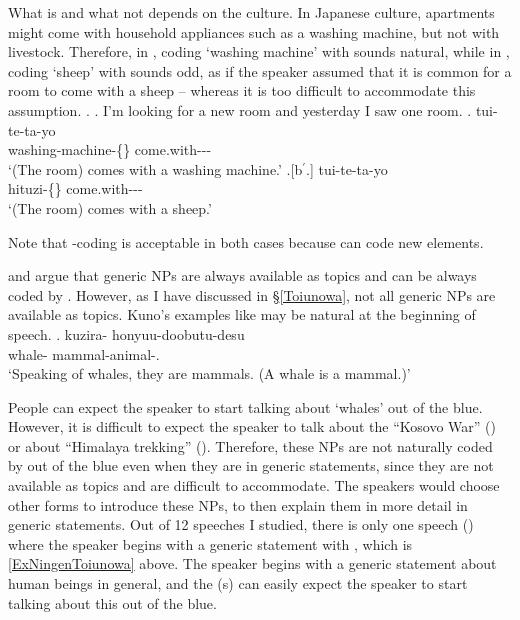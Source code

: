 What is  and what not depends on the culture.
In Japanese culture,
apartments might come with household appliances such as a washing machine,
but not with livestock.
Therefore, in \Next[b],
coding  `washing machine' with  sounds natural,
while in \Next[b$^{\prime}$],
coding  `sheep' with  sounds odd, as if the speaker assumed that it is common for a room to come with a sheep -- whereas it is too difficult to accommodate this assumption.
\ex.\label{ExSentakuki}
 \a. I'm looking for a new room and yesterday I saw one room.
 \bg.  tui-te-ta-yo \\
 	washing-machine-\{\} come.with--- \\
	`(The room) comes with a washing machine.'
 \bg.[b$^{\prime}$.]  tui-te-ta-yo \\
 	hituzi-\{\} come.with--- \\
	`(The room) comes with a sheep.'

Note that -coding is acceptable in both cases
because  can code new elements.

 and  argue that
generic NPs are always available as topics and
can be always coded by .
However, as I have discussed in \S \ref{Toiunowa},
not all generic NPs are available as topics.
Kuno's examples like \Next may be natural at the beginning of speech.
%
\exg. kuzira- honyuu-doobutu-desu \\
      whale- mammal-animal-. \\
      `Speaking of whales, they are mammals. (A whale is a mammal.)'
      \hfill{\cite[44]{kuno73}}

People can expect the speaker to start talking about  `whales' out of the blue.
However, it is difficult to expect the speaker to talk about
the ``Kosovo War'' () or about ``Himalaya trekking'' ().
Therefore,
these NPs  are not naturally coded by  out of the blue
even when they are in generic statements,
since they are not available as topics and are difficult to accommodate.
The speakers would choose other forms to introduce these NPs, to then explain them in more detail in generic statements.
Out of 12 speeches I studied,
there is only one speech () where the speaker begins with a generic statement with ,
which is \ref{ExNingenToiunowa} above.
The speaker begins with a generic statement about human beings in general, and the (s) can easily expect the speaker to start talking about this out of the blue.

